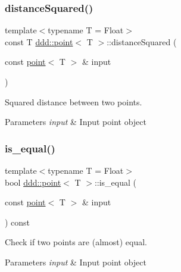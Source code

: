 \subsubsection{\texorpdfstring{distance\+Squared()}{distanceSquared()}}
{\footnotesize\ttfamily template$<$typename T = Float$>$ \\
const T \hyperlink{classddd_1_1point}{ddd\+::point}$<$ T $>$\+::distance\+Squared (\begin{DoxyParamCaption}\item[{const \hyperlink{classddd_1_1point}{point}$<$ T $>$ \&}]{input }\end{DoxyParamCaption})\hspace{0.3cm}{\ttfamily [inline]}}



Squared distance between two points. 


\begin{DoxyParams}{Parameters}
{\em input} & Input point object \\
\hline
\end{DoxyParams}
\mbox{\label{classddd_1_1point_aa4cdbbf16736ee09e840e33f77e94b8a}} 
\subsubsection{\texorpdfstring{is\+\_\+equal()}{is\_equal()}}
{\footnotesize\ttfamily template$<$typename T = Float$>$ \\
bool \hyperlink{classddd_1_1point}{ddd\+::point}$<$ T $>$\+::is\+\_\+equal (\begin{DoxyParamCaption}\item[{const \hyperlink{classddd_1_1point}{point}$<$ T $>$ \&}]{input }\end{DoxyParamCaption}) const\hspace{0.3cm}{\ttfamily [inline]}}



Check if two points are (almost) equal. 


\begin{DoxyParams}{Parameters}
{\em input} & Input point object \\
\hline
\end{DoxyParams}
\mbox{\label{classddd_1_1point_a3d2415605fc07e3e0ed54ad68e2ade92}} 
